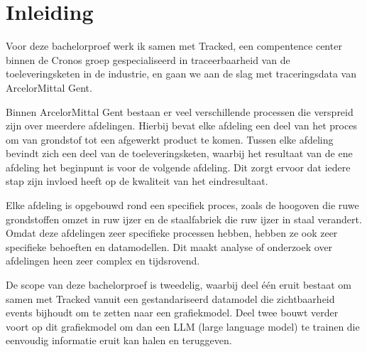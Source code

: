 


% 
\section{Inleiding}%
\label{sec:inleiding}
Voor deze bachelorproef werk ik samen met Tracked, een compentence center binnen de Cronos groep gespecialiseerd in traceerbaarheid van de toeleveringsketen in de industrie, en gaan we aan de slag met traceringsdata van ArcelorMittal Gent.

Binnen ArcelorMittal Gent bestaan er veel verschillende processen die verspreid zijn over meerdere afdelingen.
Hierbij bevat elke afdeling een deel van het proces om van grondstof tot een afgewerkt product te komen. 
Tussen elke afdeling bevindt zich een deel van de toeleveringsketen, waarbij het resultaat van de ene afdeling het beginpunt is voor de volgende afdeling.
Dit zorgt ervoor dat iedere stap zijn invloed heeft op de kwaliteit van het eindresultaat.

Elke afdeling is opgebouwd rond een specifiek proces, zoals de hoogoven die ruwe grondstoffen omzet in ruw ijzer en de staalfabriek die ruw ijzer in staal verandert.
Omdat deze afdelingen zeer specifieke processen hebben, hebben ze ook zeer specifieke behoeften en datamodellen.
Dit maakt analyse of onderzoek over afdelingen heen zeer complex en tijdsrovend.

De scope van deze bachelorproef is tweedelig, waarbij deel één eruit bestaat om samen met Tracked vanuit een gestandariseerd datamodel die zichtbaarheid events bijhoudt om te zetten naar een grafiekmodel.
Deel twee bouwt verder voort op dit grafiekmodel om dan een LLM (large language model) te trainen die eenvoudig informatie eruit kan halen en teruggeven.

